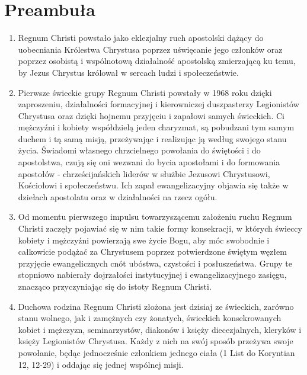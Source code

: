 ﻿\documentclass{book}
\begin{document}
\newpage




\section*{Preambuła}
\begin{enumerate}


\item Regnum Christi powstało jako eklezjalny ruch apostolski dążący do uobecniania Królestwa Chrystusa poprzez uświęcanie jego członków oraz poprzez osobistą i wspólnotową działalność apostolską zmierzającą ku temu, by Jezus Chrystus królował w sercach ludzi i społeczeństwie. 


\item Pierwsze świeckie grupy Regnum Christi powstały w 1968 roku dzięki zaproszeniu, działalności formacyjnej i kierowniczej duszpasterzy Legionistów Chrystusa oraz dzięki hojnemu przyjęciu i zapałowi samych świeckich. Ci mężczyźni i kobiety współdzielą jeden charyzmat, są pobudzani tym samym duchem i tą samą misją, przeżywając i realizując ją według swojego stanu życia. Świadomi własnego chrzcielnego powołania do świętości i do apostolstwa, czują się oni wezwani do bycia apostołami i do formowania apostołów - chrześcijańskich liderów w służbie Jezusowi Chrystusowi, Kościołowi i społeczeństwu. Ich zapał ewangelizacyjny objawia się także w dziełach apostolatu oraz w działalności na rzecz ogółu.


\item Od momentu pierwszego impulsu towarzyszącemu założeniu ruchu Regnum Christi zaczęły pojawiać się w nim takie formy konsekracji, w których świeccy kobiety i mężczyźni powierzają swe życie Bogu, aby móc swobodnie i całkowicie podążać za Chrystusem poprzez potwierdzone świętym węzłem przyjęcie ewangelicznych cnót ubóstwa, czystości i posłuszeństwa. Grupy te stopniowo nabierały dojrzałości instytucyjnej i ewangelizacyjnego zasięgu, znacząco przyczyniając się do istoty Regnum Christi.


\item Duchowa rodzina Regnum Christi złożona jest dzisiaj ze świeckich, zarówno stanu wolnego, jak i zamężnych czy żonatych, świeckich konsekrowanych kobiet i mężczyzn, seminarzystów, diakonów i księży diecezjalnych, kleryków i księży Legionistów Chrystusa. Każdy z nich na swój sposób przeżywa swoje powołanie, będąc jednocześnie członkiem jednego ciała (1 List do Koryntian 12, 12-29) i oddając się jednej wspólnej misji.



\end{enumerate}
\end{document}
